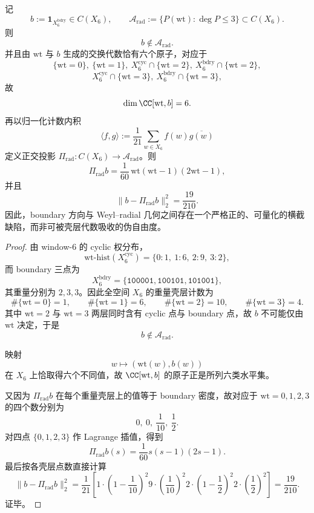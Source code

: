\begin{theorem}\label{thm:conclusion-window6-boundary-radial-defect}
记
\[
b:=\mathbf 1_{X_6^{\mathrm{bdry}}}\in C(X_6),
\qquad
\mathcal A_{\mathrm{rad}}:=\{P(\mathrm{wt}):\deg P\le 3\}\subset C(X_6).
\]
则
\[
b\notin \mathcal A_{\mathrm{rad}}.
\]
并且由 \(\mathrm{wt}\) 与 \(b\) 生成的交换代数恰有六个原子，对应于
\[
\{\mathrm{wt}=0\},\ \{\mathrm{wt}=1\},\
X_6^{\mathrm{cyc}}\cap\{\mathrm{wt}=2\},\ X_6^{\mathrm{bdry}}\cap\{\mathrm{wt}=2\},
\]
\[
X_6^{\mathrm{cyc}}\cap\{\mathrm{wt}=3\},\ X_6^{\mathrm{bdry}}\cap\{\mathrm{wt}=3\},
\]
故
\[
\dim \CC[\mathrm{wt},b]=6.
\]
再以归一化计数内积
\[
\langle f,g\rangle:=\frac1{21}\sum_{w\in X_6}f(w)\overline{g(w)}
\]
定义正交投影 \(\Pi_{\mathrm{rad}}:C(X_6)\to \mathcal A_{\mathrm{rad}}\)。则
\[
\Pi_{\mathrm{rad}}b
=
\frac{1}{60}\,\mathrm{wt}(\mathrm{wt}-1)(2\mathrm{wt}-1),
\]
并且
\[
\|b-\Pi_{\mathrm{rad}}b\|_2^2=\frac{19}{210}.
\]
因此，boundary 方向与 Weyl--radial 几何之间存在一个严格正的、可量化的横截缺陷，而非可被壳层代数吸收的伪自由度。
\end{theorem}
\begin{proof}
由 window-\(6\) 的 cyclic 权分布，
\[
\mathrm{wt\text{-}hist}(X_6^{\mathrm{cyc}})=\{0:1,\ 1:6,\ 2:9,\ 3:2\},
\]
而 boundary 三点为
\[
X_6^{\mathrm{bdry}}=\{\mathtt{100001},\mathtt{100101},\mathtt{101001}\},
\]
其重量分别为 \(2,3,3\)。因此全空间 \(X_6\) 的重量壳层计数为
\[
\#\{\mathrm{wt}=0\}=1,\qquad
\#\{\mathrm{wt}=1\}=6,\qquad
\#\{\mathrm{wt}=2\}=10,\qquad
\#\{\mathrm{wt}=3\}=4.
\]
其中 \(\mathrm{wt}=2\) 与 \(\mathrm{wt}=3\) 两层同时含有 cyclic 点与 boundary 点，故 \(b\) 不可能仅由 \(\mathrm{wt}\) 决定，于是
\[
b\notin \mathcal A_{\mathrm{rad}}.
\]

映射
\[
w\longmapsto (\mathrm{wt}(w),b(w))
\]
在 \(X_6\) 上恰取得六个不同值，故 \(\CC[\mathrm{wt},b]\) 的原子正是所列六类水平集。

又因为 \(\Pi_{\mathrm{rad}}b\) 在每个重量壳层上的值等于 boundary 密度，故对应于 \(\mathrm{wt}=0,1,2,3\) 的四个数分别为
\[
0,\ 0,\ \frac1{10},\ \frac12.
\]
对四点 \(\{0,1,2,3\}\) 作 Lagrange 插值，得到
\[
\Pi_{\mathrm{rad}}b(s)=\frac1{60}s(s-1)(2s-1).
\]
最后按各壳层点数直接计算
\[
\|b-\Pi_{\mathrm{rad}}b\|_2^2
=
\frac1{21}\left[
1\cdot\left(1-\frac1{10}\right)^2
9\cdot\left(\frac1{10}\right)^2
2\cdot\left(1-\frac12\right)^2
2\cdot\left(\frac12\right)^2
\right]
=
\frac{19}{210}.
\]
证毕。
\end{proof}

